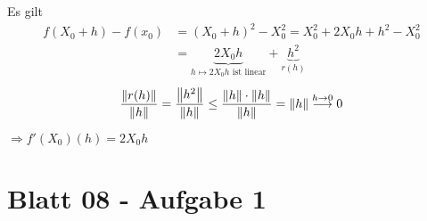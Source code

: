 \documentclass{scrreprt}
\begin{document}
Es gilt
\begin{align*}
  f(X_0 + h) - f(x_0) &= (X_0 + h)^2 - X_0^2 = X_0^2 + 2X_0h + h^2 - X_0^2 \\
                      &= \underset{h \mapsto 2X_0h \text{ ist linear}}{\underbrace{2X_0h}} +
                        \underset{r(h)}{\underbrace{h^2}}
\end{align*}
\[
  \frac{\norm{r(h)}}{\norm{h}} = \frac{\norm{h^2}}{\norm{h}}
  \leq \frac{\norm{h} \cdot \norm{h}}{\norm{h}} = \norm{h}
  \overset{h \to 0}\longrightarrow 0
\]

$\Rightarrow f'(X_0)(h) = 2X_0h$

\section{Blatt 08 - Aufgabe 1}
\end{document}
